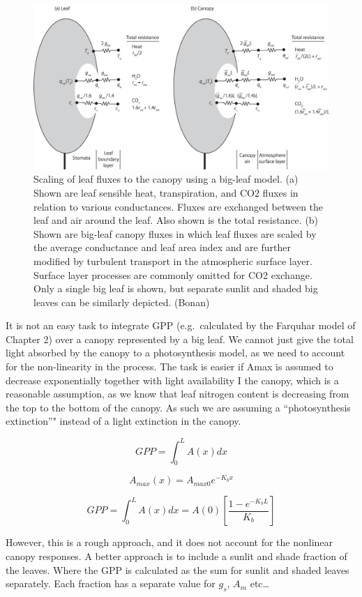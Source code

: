\documentclass[12pt,oneside]{book}
\begin{document}
\begin{figure}

{\centering \includegraphics[width=0.8\linewidth]{figures/chap3/f323_bigleaf} 

}

\caption{Scaling of leaf fluxes to the canopy using a big-leaf model. (a) Shown are leaf sensible heat, transpiration, and CO2 fluxes in relation to various conductances. Fluxes are exchanged between the leaf and air around the leaf. Also shown is the total resistance. (b) Shown are big-leaf canopy fluxes in which leaf fluxes are scaled by the average conductance and leaf area index and are further modified by turbulent transport in the atmospheric surface layer. Surface layer processes are commonly omitted for CO2 exchange. Only a single big leaf is shown, but separate sunlit and shaded big leaves can be similarly depicted. (Bonan)}\label{fig:f323}
\end{figure}

It is not an easy task to integrate GPP (e.g.~calculated by the Farquhar
model of Chapter 2) over a canopy represented by a big leaf. We cannot
just give the total light absorbed by the canopy to a photosynthesis
model, as we need to account for the non-linearity in the process. The
task is easier if Amax is assumed to decrease exponentially together
with light availability I the canopy, which is a reasonable assumption,
as we know that leaf nitrogen content is decreasing from the top to the
bottom of the canopy. As such we are assuming a ``photosynthesis
extinction''" instead of a light extinction in the canopy.

\[
GPP = \int_0^LA(x)dx
\]

\[
A_{max}(x) = A_{max0}e^{-K_bx}
\]

\[
GPP = \int_0^{L}A(x)dx = A(0) \left[\frac{1 - e^{-K_b L}}{K_b} \right]
\]

However, this is a rough approach, and it does not account for the
nonlinear canopy responses. A better approach is to include a sunlit and
shade fraction of the leaves. Where the GPP is calculated as the sum for
sunlit and shaded leaves separately. Each fraction has a separate value
for \(g_s\), \(A_m\) etc\ldots{}
\end{document}
